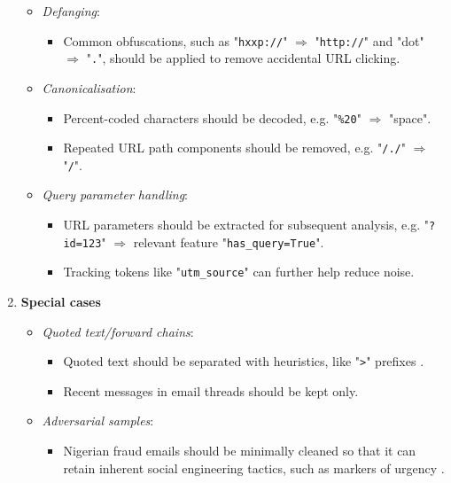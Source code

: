 \begin{enumerate}
  \begin{itemize}
    \item \textit{Defanging}:
    \begin{itemize}
      \item Common obfuscations, such as "\texttt{hxxp://}" $\Rightarrow$ "\texttt{http://}" and "dot" $\Rightarrow$ "\texttt{.}", should be applied to remove accidental URL clicking.
    \end{itemize}
    \item \textit{Canonicalisation}:
    \begin{itemize}
      \item Percent-coded characters should be decoded, e.g. "\texttt{\%20}" $\Rightarrow$ "space".
      \item Repeated URL path components should be removed, e.g. "\texttt{/./}" $\Rightarrow$ "\texttt{/}".
    \end{itemize}
    \item \textit{Query parameter handling}:
    \begin{itemize}
      \item URL parameters should be extracted for subsequent analysis, e.g. "\texttt{?id=123}" $\Rightarrow$ relevant feature "\texttt{has\_query=True}".
      \item Tracking tokens like "\texttt{utm\_source}" can further help reduce noise.
    \end{itemize}
  \end{itemize}
\item \textbf{Special cases}
\begin{itemize}
  \item \textit{Quoted text/forward chains}:
  \begin{itemize}
    \item Quoted text should be separated with heuristics, like "\texttt{>}" prefixes \citep{klimt2004enron}.
    \item Recent messages in email threads should be kept only.
  \end{itemize}
  \item \textit{Adversarial samples}:
  \begin{itemize}
    \item Nigerian fraud emails should be minimally cleaned so that it can retain inherent social engineering tactics, such as markers of urgency \citep{champa2024phishing}.
  \end{itemize}
\end{itemize}
\end{enumerate}
